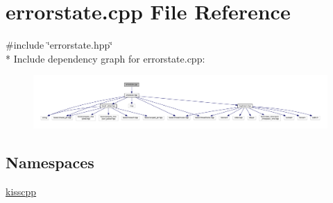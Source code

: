 \hypertarget{a00057}{\section{errorstate.\-cpp File Reference}
\label{a00057}
}
{\ttfamily \#include \char`\"{}errorstate.\-hpp\char`\"{}}\\*
Include dependency graph for errorstate.\-cpp\-:\nopagebreak
\begin{figure}[H]
\begin{center}
\leavevmode
\includegraphics[width=350pt]{a00104}
\end{center}
\end{figure}
\subsection*{Namespaces}
\begin{DoxyCompactItemize}
\item 
\hyperlink{a00089}{kisscpp}
\end{DoxyCompactItemize}
